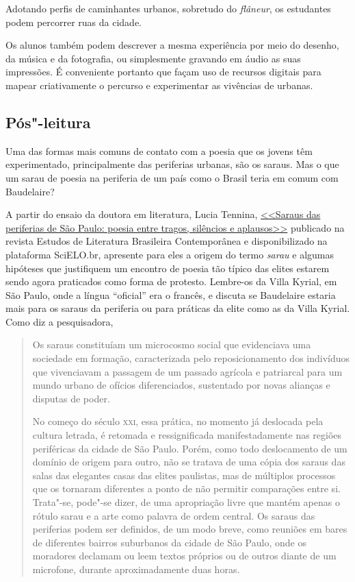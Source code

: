 \documentclass[12pt]{extarticle}
\begin{document}

Adotando perfis de caminhantes urbanos, sobretudo do \textit{flâneur}, os
estudantes podem percorrer ruas da cidade.

Os alunos também podem descrever a mesma experiência por meio do desenho, 
da música e da fotografia, ou simplesmente gravando em áudio as 
suas impressões. É conveniente portanto que façam uso
de recursos digitais para mapear criativamente o percurso e
experimentar as vivências de urbanas.

\subsection{Pós"-leitura}

Uma das formas mais comuns de contato com a poesia que os jovens 
têm experimentado, principalmente das periferias urbanas, são 
os saraus. Mas o que um sarau de poesia na periferia de um 
país como o Brasil teria em comum com Baudelaire? 

A partir do ensaio da doutora em literatura, Lucia Tennina, 
\href{http://www.scielo.br/pdf/elbc/n42/01.pdf}{<<Saraus das periferias de São Paulo:
poesia entre tragos, silêncios e aplausos>>} publicado na revista 
Estudos de Literatura Brasileira Contemporânea e disponibilizado 
na plataforma SciELO.br, apresente para eles a origem do termo 
\emph{sarau} e algumas hipóteses que justifiquem um encontro de poesia
tão típico das elites estarem sendo agora praticados como forma 
de protesto. Lembre-os da Villa Kyrial, em São Paulo, 
onde a língua ``oficial'' era o francês, e discuta se Baudelaire 
estaria mais para os saraus da periferia ou para práticas 
da elite como as da Villa Kyrial. Como diz a pesquisadora, 

\begin{quote}
Os saraus constituíam um microcosmo social que evidenciava uma
sociedade em formação, caracterizada pelo reposicionamento dos indivíduos 
que vivenciavam a passagem de um passado agrícola e patriarcal
para um mundo urbano de ofícios diferenciados, sustentado por novas
alianças e disputas de poder.

No começo do século \textsc{xxi}, essa prática, no momento já deslocada pela
cultura letrada, é retomada e ressignificada manifestadamente nas regiões
periféricas da cidade de São Paulo. Porém, como todo deslocamento de
um domínio de origem para outro, não se tratava de uma cópia dos saraus
das salas das elegantes casas das elites paulistas, mas de múltiplos 
processos que os tornaram diferentes a ponto de não permitir comparações entre
si. Trata"-se, pode"-se dizer, de uma apropriação livre que mantém apenas o
rótulo sarau e a arte como palavra de ordem central.
Os saraus das periferias podem ser definidos, de um modo breve,
como reuniões em bares de diferentes bairros suburbanos da cidade de
São Paulo, onde os moradores declamam ou leem textos próprios ou de outros 
diante de um microfone, durante aproximadamente duas horas. 
\end{quote}
\end{document}
